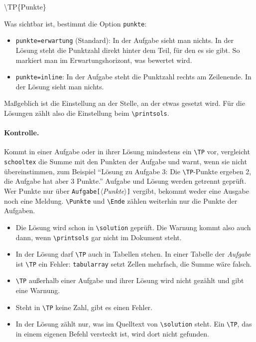 \documentclass[a4paper,11pt,parskip=half]{scrartcl}
\newcommand{\cs}[1]{\texttt{\textbackslash #1}}
\newcommand{\env}[1]{\texttt{#1}}
\newcommand{\oarg}[1]{\texttt{[}\meta{#1}\texttt{]}}
\newcommand{\meta}[1]{\ensuremath{\langle}\textit{#1}\ensuremath{\rangle}}
\begin{document}
\begin{befehl}{\textbackslash TP\{Punkte\}}\end{befehl}

Was sichtbar ist, bestimmt die Option \texttt{punkte}:
\begin{itemize}
  \item \texttt{punkte=erwartung} (Standard): In der Aufgabe sieht man nichts. In der Lösung
        steht die Punktzahl direkt hinter dem Teil, für den es sie gibt. So markiert man im
        Erwartungshorizont, was bewertet wird.
  \item \texttt{punkte=inline}: In der Aufgabe steht die Punktzahl rechts am Zeilenende.
        In der Lösung sieht man nichts.
\end{itemize}
Maßgeblich ist die Einstellung an der Stelle, an der etwas gesetzt wird. Für die Lösungen zählt
also die Einstellung beim \cs{printsols}.

\begin{code}
\begin{Aufgabe}[5]
\end{Aufgabe}
\end{code}

\paragraph{Kontrolle.} Kommt in einer Aufgabe oder in ihrer Lösung mindestens ein \cs{TP} vor,
vergleicht \texttt{schooltex} die Summe mit den Punkten der Aufgabe und warnt, wenn sie nicht
übereinstimmen, zum Beispiel
\enquote{Lösung zu Aufgabe 3: Die \cs{TP}-Punkte ergeben 2, die Aufgabe hat aber 3 Punkte.}
Aufgabe und Lösung werden getrennt geprüft. Wer Punkte nur über \env{Aufgabe}\oarg{Punkte}
vergibt, bekommt weder eine Ausgabe noch eine Meldung. \cs{Punkte} und \cs{Ende} zählen
weiterhin nur die Punkte der Aufgaben.

\begin{itemize}
  \item Die Lösung wird schon in \cs{solution} geprüft. Die Warnung kommt also auch dann,
        wenn \cs{printsols} gar nicht im Dokument steht.
  \item In der Lösung darf \cs{TP} auch in Tabellen stehen. In einer Tabelle der
        \emph{Aufgabe} ist \cs{TP} ein Fehler: \texttt{tabularray} setzt Zellen mehrfach,
        die Summe wäre falsch.
  \item \cs{TP} außerhalb einer Aufgabe und ihrer Lösung wird nicht gezählt und gibt eine Warnung.
  \item Steht in \cs{TP} keine Zahl, gibt es einen Fehler.
  \item In der Lösung zählt nur, was im Quelltext von \cs{solution} steht. Ein \cs{TP}, das in
        einem eigenen Befehl versteckt ist, wird dort nicht gefunden.
\end{itemize}
\end{document}
